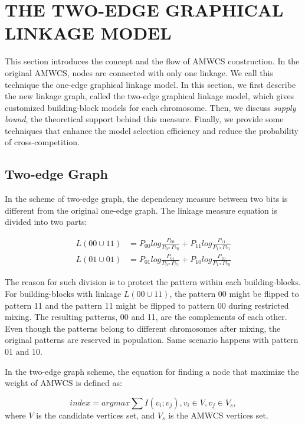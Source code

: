 \documentclass{sig-alternate-05-2015}
\begin{document}
\section{THE TWO-EDGE GRAPHICAL LINKAGE MODEL}
This section introduces the concept and the flow of AMWCS construction. In the original AMWCS, nodes are connected with only one linkage. We call this technique the one-edge graphical linkage model. In this section, we first describe the new linkage graph, called the two-edge graphical linkage model, which gives customized building-block models for each chromosome. Then, we discuss \textit{supply bound}, the theoretical support behind this measure. Finally, we provide some techniques that enhance the model selection efficiency and reduce the probability of cross-competition. 

\subsection{Two-edge Graph}
In the scheme of two-edge graph, the dependency measure between two bits is different from the original one-edge graph. The linkage measure equation is divided into two parts:

\begin{equation} 
\begin{split}
L( 00 \cup 11 ) &= P_{00 }log\frac{P_{00}}{P_{0*} P_{*0}} + P_{11 }log\frac{P_{11}}{P_{1*} P_{*1}}  \\
L( 01 \cup 01 ) &= P_{01 }log\frac{P_{01}}{P_{0*} P_{*1}} + P_{10 }log\frac{P_{10}}{P_{1*} P_{*0}}  
\end{split}
\end{equation}

The reason for such division is to protect the pattern within each building-blocks. For building-blocks with linkage  $L(00\cup11)$, the pattern 00 might be flipped to pattern 11 and the pattern 11 might be flipped to pattern 00 during restricted mixing. The resulting patterns, 00 and 11, are the complements of each other. Even though the patterns belong to different chromosomes after mixing, the original patterns are reserved in population. Same scenario happens with pattern 01 and 10.


In the two-edge graph scheme, the equation for finding a node that maximize the weight of AMWCS is defined as:

\begin{equation} \textit{index} = argmax\sum I(v_i;v_j), {v_i\in V}, {v_j \in V_s},\end{equation}
where $V$ is the candidate vertices set, and $V_s$ is the AMWCS vertices set.
\end{document}
